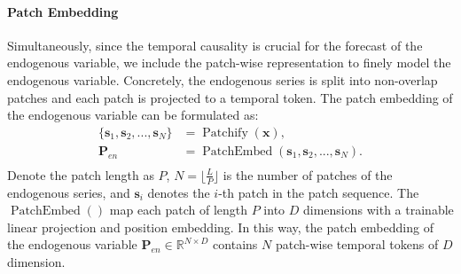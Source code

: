 \documentclass[nohyperref]{article}
\theoremstyle{plain}
\theoremstyle{definition}
\theoremstyle{remark}
\begin{document}
\paragraph{Patch Embedding}
Simultaneously, since the temporal causality is crucial for the forecast of the endogenous variable, we include the patch-wise representation to finely model the endogenous variable. Concretely, the endogenous series is split into non-overlap patches and each patch is projected to a temporal token. The patch embedding of the endogenous variable can be formulated as:
\begin{equation}
    \begin{aligned}
        \{\mathbf{s}_1, \mathbf{s}_2, ..., \mathbf{s}_N\} &= \operatorname{Patchify} \left(\mathbf{x}\right), \\
        \mathbf{P}_{en} &= \operatorname{PatchEmbed} \left(\mathbf{s}_1, \mathbf{s}_2, ..., \mathbf{s}_N\right). \\
    \end{aligned}
\end{equation}
Denote the patch length as $P$, $N = \lfloor \frac{L}{P} \rfloor$ is the number of patches of the endogenous series, and $\mathbf{s}_i$ denotes the $i$-th patch in the patch sequence. The $\operatorname{PatchEmbed}()$ map each patch of length $P$ into $D$ dimensions with a trainable linear projection and position embedding. In this way, the patch embedding of the endogenous variable $\mathbf{P}_{en} \in \mathbb{R}^{N \times D}$ contains $N$ patch-wise temporal tokens of $D$ dimension.
\end{document}
